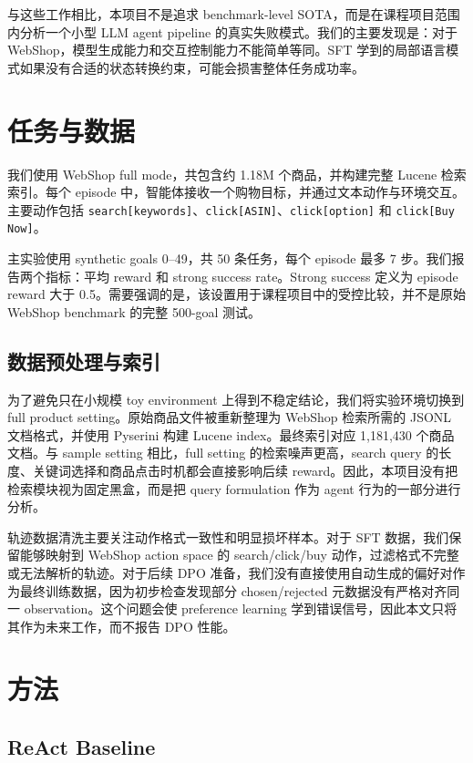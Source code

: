 \documentclass[11pt]{article}
\begin{document}
与这些工作相比，本项目不是追求 benchmark-level SOTA，而是在课程项目范围内分析一个小型 LLM agent pipeline 的真实失败模式。我们的主要发现是：对于 WebShop，模型生成能力和交互控制能力不能简单等同。SFT 学到的局部语言模式如果没有合适的状态转换约束，可能会损害整体任务成功率。

\section{任务与数据}

我们使用 WebShop full mode，共包含约 1.18M 个商品，并构建完整 Lucene 检索索引。每个 episode 中，智能体接收一个购物目标，并通过文本动作与环境交互。主要动作包括 \texttt{search[keywords]}、\texttt{click[ASIN]}、\texttt{click[option]} 和 \texttt{click[Buy Now]}。

主实验使用 synthetic goals 0--49，共 50 条任务，每个 episode 最多 7 步。我们报告两个指标：平均 reward 和 strong success rate。Strong success 定义为 episode reward 大于 0.5。需要强调的是，该设置用于课程项目中的受控比较，并不是原始 WebShop benchmark 的完整 500-goal 测试。

\subsection{数据预处理与索引}

为了避免只在小规模 toy environment 上得到不稳定结论，我们将实验环境切换到 full product setting。原始商品文件被重新整理为 WebShop 检索所需的 JSONL 文档格式，并使用 Pyserini 构建 Lucene index。最终索引对应 1,181,430 个商品文档。与 sample setting 相比，full setting 的检索噪声更高，search query 的长度、关键词选择和商品点击时机都会直接影响后续 reward。因此，本项目没有把检索模块视为固定黑盒，而是把 query formulation 作为 agent 行为的一部分进行分析。

轨迹数据清洗主要关注动作格式一致性和明显损坏样本。对于 SFT 数据，我们保留能够映射到 WebShop action space 的 search/click/buy 动作，过滤格式不完整或无法解析的轨迹。对于后续 DPO 准备，我们没有直接使用自动生成的偏好对作为最终训练数据，因为初步检查发现部分 chosen/rejected 元数据没有严格对齐同一 observation。这个问题会使 preference learning 学到错误信号，因此本文只将其作为未来工作，而不报告 DPO 性能。

\section{方法}

\subsection{ReAct Baseline}
\end{document}
